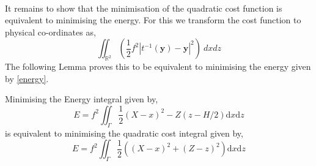 \\
\linebreak
It remains to show that the minimisation of the quadratic cost function is equivalent to minimising the energy. For this we transform the cost function to physical co-ordinates as,
\begin{equation*}
\iint_{\mathbb{R}^2} \left(\frac{1}{2}f^2|t^{-1}(\bm{y})-\bm{y}|^2\right) \ dxdz
\end{equation*}
The following Lemma proves this to be equivalent to minimising the energy given by \ref{energy}.
\begin{lemma}
	Minimising the Energy integral given by,
	\begin{equation*}
	E = f^2 \iint_{\Gamma} \frac{1}{2}\left(X-x\right)^2 - Z\left(z - H/2\right)\textrm{d}x\textrm{d}z
	\end{equation*} 
	is equivalent to minimising the quadratic cost integral given by,
	\begin{equation*}
	E = f^2 \iint_{\Gamma} \frac{1}{2}\left(\left(X-x\right)^2 + \left(Z - z\right)^2\right)\textrm{d}x\textrm{d}z
	\label{energy1}
	\end{equation*}
	\label{energy lemma}
\end{lemma}

